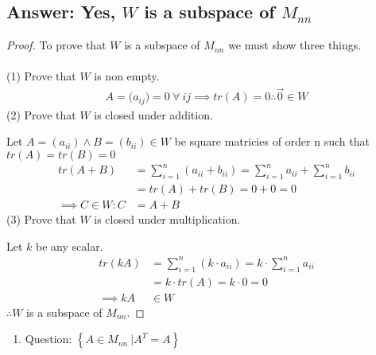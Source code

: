\documentclass[12pt]{article}
\newcommand{\DS} [1] {${\displaystyle #1}$}
\begin{document}
\subsection{Answer: Yes, $W$ is a subspace of $M_{nn}$}
\begin{proof}
        To prove that $W$ is a subspace of $M_{nn}$ we must show three things.\\\\
        (1) Prove that $W$ is non empty.
        \begin{align*}
                A=({a_{ij})=0}\ \forall\ ij \implies tr(A)=0 \therefore \vec{0} \in W
        \end{align*}
        (2) Prove that $W$ is closed under addition.

        Let $A = ({a_{ii}})\land B = ({b_{ii}})\in W$ be square matricies of order n such that $tr(A) = tr(B) = 0$
        \begin{align*}
                tr(A+B)             & = \sum_{i = 1}^{n}(a_{ii}+b_{ii}) = \sum_{i = 1}^{n}a_{ii} + \sum_{i = 1}^{n}b_{ii} \\
                                    & = tr(A) + tr(B) = 0 + 0 = 0                                                         \\
                \implies C\in W : C & = A+B
        \end{align*}
        (3) Prove that $W$ is closed under multiplication.

        Let ${k}$ be any scalar.
        \begin{align*}
                tr(kA)      & = \sum_{i = 1}^{n}(k\cdot a_{ii}) = k\cdot \sum_{i = 1}^{n}a_{ii} \\
                            & = k\cdot tr(A) = k\cdot 0 = 0                                     \\
                \implies kA & \in W
        \end{align*}
        $\therefore W$ is a subspace of $M_{nn}$.
\end{proof}
\pagebreak
\begin{enumerate}
        \item [3.c]Question: \DS{ \left\{A \in{M_{nn}} \ | A^T = A \right\}}
\end{enumerate}
\end{document}
